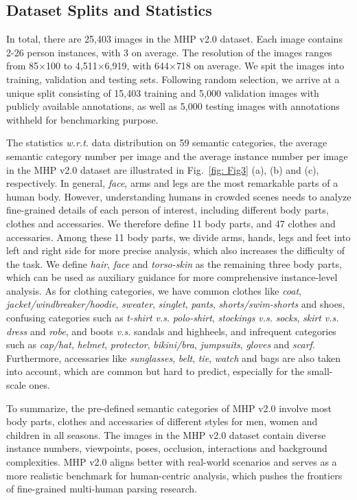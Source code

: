 \documentclass[10pt,twocolumn,letterpaper]{article}
\theoremstyle{definition}
\theoremstyle{remark}
\begin{document}
\subsection{Dataset Splits and Statistics}

In total, there are 25{,}403 images in the MHP v2.0 dataset. Each image contains 2-26 person instances, with 3 on average. The resolution of the images ranges from 85$\times$100 to 4{,}511$\times$6{,}919, with 644$\times$718 on average. We spit the images into training, validation and testing sets. Following random selection, we arrive at a unique split consisting of 15{,}403 training and 5{,}000 validation images with publicly available annotations, as well as  5{,}000 testing images with annotations withheld for benchmarking purpose.  

The statistics \emph{w.r.t.} data distribution on 59 semantic categories, the average semantic category number per image and the average instance number per image in the MHP v2.0 dataset are illustrated in Fig.~\ref{fig: Fig3} (a), (b) and (c), respectively. In general, \emph{face}, arms and legs are the most remarkable parts of a human body. However, understanding humans in crowded scenes needs to analyze fine-grained details of each person of interest, including different body parts, clothes and accessaries. We therefore define 11 body parts, and 47 clothes and accessaries. Among these 11 body parts, we divide arms, hands, legs and feet into left and right side for more precise analysis, which also increases the difficulty of the task. We define \emph{hair}, \emph{face} and \emph{torso-skin} as the remaining three body parts, which can be used as auxiliary guidance for more comprehensive instance-level analysis. As for clothing categories, we have common clothes like \emph{coat}, \emph{jacket/windbreaker/hoodie}, \emph{sweater}, \emph{singlet}, \emph{pants}, \emph{shorts/swim-shorts} and shoes, confusing categories such as \emph{t-shirt} \emph{v.s.} \emph{polo-shirt}, \emph{stockings} \emph{v.s.} \emph{socks}, \emph{skirt} \emph{v.s.} \emph{dress} and \emph{robe}, and boots \emph{v.s.} sandals and highheels, and infrequent categories such as \emph{cap/hat}, \emph{helmet}, \emph{protector}, \emph{bikini/bra}, \emph{jumpsuits}, \emph{gloves} and \emph{scarf}. Furthermore, accessaries like \emph{sunglasses}, \emph{belt}, \emph{tie}, \emph{watch} and bags are also taken into account, which are common but hard to predict, especially for the small-scale ones. 

To summarize, the pre-defined semantic categories of MHP v2.0 involve most body parts, clothes and accessaries of different styles for men, women and children in all seasons. The images in the MHP v2.0 dataset contain diverse instance numbers, viewpoints, poses, occlusion, interactions and background complexities. MHP v2.0 aligns better with real-world scenarios and serves as a more realistic benchmark for human-centric analysis, which pushes the frontiers of fine-grained multi-human parsing research.
\end{document}
